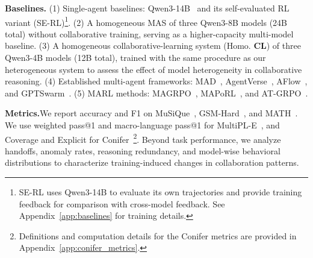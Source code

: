 \documentclass{article} %
\newcommand{\lmttbf}[1]{{\fontfamily{lmtt}\selectfont\bfseries #1}}
\begin{document}

\noindent\textbf{Baselines.}\quad
(1) Single-agent baselines: Qwen3-14B~\citep{yang2025qwen3} and its self-evaluated RL variant (SE-RL)\footnote{SE-RL uses Qwen3-14B to evaluate its own trajectories and provide training feedback for comparison with cross-model feedback. See Appendix~\ref{app:baselines} for training details.}.
(2) A homogeneous MAS of three Qwen3-8B models (24B total) without collaborative training, serving as a higher-capacity multi-model baseline.
(3) A homogeneous collaborative-learning system (Homo. \lmttbf{CL}) of three Qwen3-4B models (12B total), trained with the same procedure as our heterogeneous system to assess the effect of model heterogeneity in collaborative reasoning.
(4) Established multi-agent frameworks: MAD~\citep{du2024debate}, AgentVerse~\citep{chen2024agentverse}, AFlow~\citep{zhang2025aflow}, and GPTSwarm~\citep{zhuge2024gptswarm}.
(5) MARL methods: MAGRPO~\citep{liu2026collaboration}, MAPoRL~\citep{park2025maporl}, and AT-GRPO~\citep{zhao2026strongermas}.

\noindent\textbf{Metrics.}\quad We report accuracy and F1 on MuSiQue~\citep{trivedi2022musique}, GSM-Hard~\citep{gao2023pal}, and MATH~\citep{hendrycks2021math}. We use weighted pass@1 and macro-language pass@1 for MultiPL-E~\citep{cassano2023multiple}, and Coverage and Explicit for Conifer~\citep{sun2024conifer}\footnote{Definitions and computation details for the Conifer metrics are provided in Appendix~\ref{app:conifer_metrics}.}. Beyond task performance, we analyze handoffs, anomaly rates, reasoning redundancy, and model-wise behavioral distributions to characterize training-induced changes in collaboration patterns.
\end{document}
